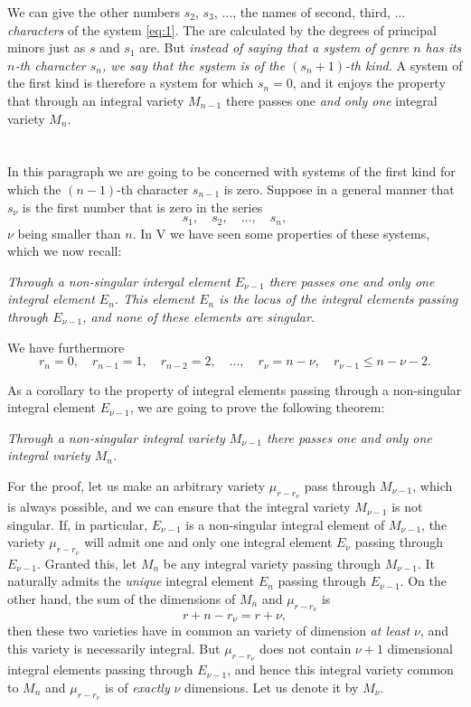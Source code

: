 \documentclass[leqno,11pt]{book}
\theoremstyle{shape1}
\theoremstyle{shapesmall}
\newcommand{\somespace}{\vspace{9pt}}
\begin{document}
We can give the other numbers $s_{2}$, $s_{3}$, $\dots$, the names of second, third, $\dots$ \emph{characters} of the system \eqref{eq:1}. The are calculated by the degrees of principal minors just as $s$ and $s_{1}$ are. But \emph{instead of saying that a system of genre $n$ has its $n$-th character $s_{n}$, we say that the system is of the $(s_{n}+1)$-th kind.} A system of the first kind is therefore a system for which $s_{n}=0$, and it enjoys the property that through an integral variety $M_{n-1}$ there passes one \emph{and only one} integral variety $M_{n}$.

\section{}
\label{sec:7}

In this paragraph we are going to be concerned with systems of the first kind for which the $(n-1)$-th character $s_{n-1}$ is zero. Suppose in a general manner that $s_{\nu}$ is the first number that is zero in the series
\[
s_{1},\quad s_{2},\quad \dots,\quad s_{n},
\]
$\nu$ being smaller than $n$. In \textsection V we have seen some properties of these systems, which we now recall:

\somespace

\emph{Through a non-singular intergal element $E_{\nu-1}$ there passes one and only one integral element $E_{n}$. This element $E_{n}$ is the locus of the integral elements passing through $E_{\nu-1}$, and none of these elements are singular.}

\somespace

We have furthermore
\[
r_{n}=0,\quad r_{n-1}=1,\quad r_{n-2}=2,\quad\dots,\quad r_{\nu}=n-\nu,\quad r_{\nu-1}\le n-\nu-2.
\]

As a corollary to the property of integral elements passing through a non-singular integral element $E_{\nu-1}$, we are going to prove the following theorem:

\somespace

\emph{Through a non-singular integral variety $M_{\nu-1}$ there passes one and only one integral variety $M_{n}$.}

\somespace

For the proof, let us make an arbitrary variety $\mu_{r-r_{\nu}}$ pass through $M_{\nu-1}$, which is always possible, and we can ensure that the integral variety $M_{\nu-1}$ is not singular. If, in particular, $E_{\nu-1}$ is a non-singular integral element of $M_{\nu-1}$, the variety $\mu_{r-r_{\nu}}$ will admit one and only one integral element $E_{\nu}$ passing through $E_{\nu-1}$. Granted this, let $M_{n}$ be any integral variety passing through $M_{\nu-1}$. It naturally admits the \emph{unique} integral element $E_{n}$ passing through $E_{\nu-1}$. On the other hand, the sum of the dimensions of $M_{n}$ and $\mu_{r-r_{\nu}}$ is
\[
r+n-r_{\nu}=r+\nu,
\]
then these two varieties have in common an variety of dimension \emph{at least} $\nu$, and this variety is necessarily integral. But $\mu_{r-r_{\nu}}$ does not contain $\nu+1$ dimensional integral elements passing through $E_{\nu-1}$, and hence this integral variety common to $M_{n}$ and $\mu_{r-r_{\nu}}$ is of \emph{exactly} $\nu$ dimensions. Let us denote it by $M_{\nu}$.
\end{document}
